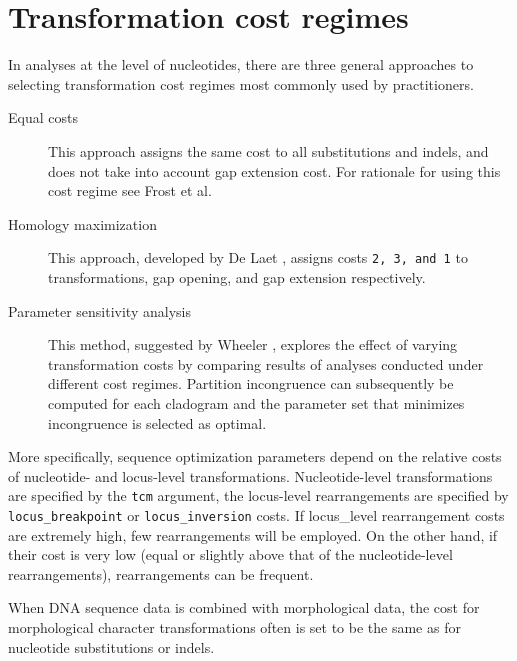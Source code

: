 \section{Transformation cost regimes}
In analyses at the level of nucleotides, there are three general approaches to selecting transformation cost regimes 
most commonly used by \poy practitioners.
\begin{description}
\item[Equal costs] This approach assigns the same cost to all substitutions and indels, and does not take into 
account gap extension cost. For rationale for using this cost regime see Frost et al. \cite{frost2001} %
\item[Homology maximization] This approach, developed by De Laet \cite{delaet2005}, assigns costs 
\texttt{2, 3, and 1} to transformations, gap opening, and gap extension respectively. %
\item[Parameter sensitivity analysis] This method, suggested by Wheeler \cite{wheeler1995}, explores the 
effect of varying transformation costs by comparing results of analyses conducted under different cost regimes. 
Partition incongruence can subsequently be computed  for each cladogram and the parameter set that minimizes 
incongruence is selected as optimal. %
\end{description}
More specifically, sequence optimization parameters depend on the relative costs of nucleotide- and locus-level transformations. 
Nucleotide-level transformations are specified by the \texttt{tcm} argument, the locus-level rearrangements are specified by 
\texttt{locus\_breakpoint} or \texttt{locus\_inversion} costs. If locus\_level rearrangement costs are extremely high, few 
rearrangements will be employed. On the other hand, if their cost is very low (equal or slightly above that of the nucleotide-level 
rearrangements), rearrangements can be frequent.

When DNA sequence data is combined with morphological data, the cost for morphological character transformations 
often is  set to be the same as for 
nucleotide substitutions or indels.

